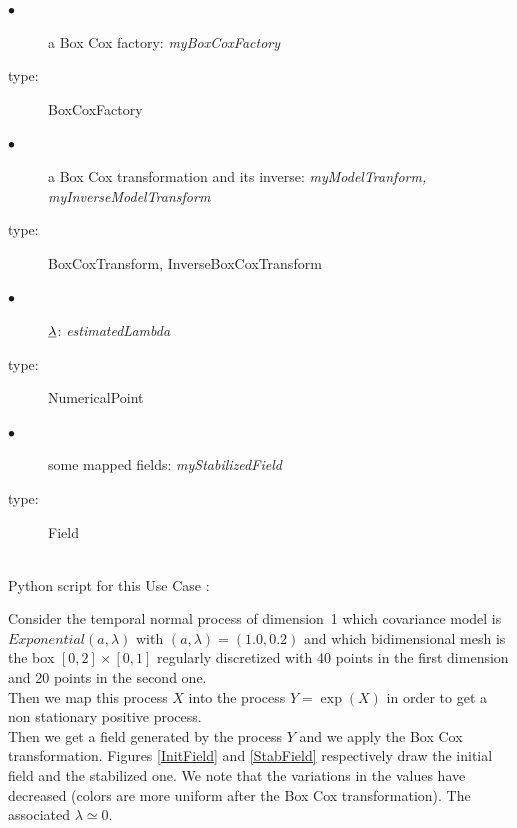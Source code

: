 {
  \begin{description}
  \item[$\bullet$] a Box Cox factory: {\itshape myBoxCoxFactory }
  \item[type:]  BoxCoxFactory
  \end{description}

  \begin{description}
  \item[$\bullet$] a Box Cox transformation and its inverse: {\itshape myModelTranform, myInverseModelTransform}
  \item[type:]  BoxCoxTransform, InverseBoxCoxTransform
  \end{description}


  \begin{description}
  \item[$\bullet$] ${\underline{\lambda}}$: {\itshape estimatedLambda}
  \item[type:]  NumericalPoint
  \end{description}


  \begin{description}
  \item[$\bullet$] some mapped fields: {\itshape myStabilizedField}
  \item[type:]  Field
  \end{description}
}

\textspace\\
Python script for this Use Case :



Consider the temporal normal process of dimension~1 which covariance model is $Exponential(a,\lambda)$ with $(a, \lambda)=(1.0, 0.2)$ and which  bidimensional mesh is the box $[0,2]\times [0,1]$ regularly discretized with 40 points in the first dimension and 20 points in the second one. \\
Then we map this process $X$ into the process $Y=\exp(X)$ in order to get a non stationary  positive process.\\
Then we get a field generated by the process $Y$ and we apply the Box Cox transformation. Figures \ref{InitField} and  \ref{StabField} respectively draw the initial field and the stabilized one. We note that the variations in the values have decreased (colors are more uniform after the Box Cox transformation). The associated $\lambda\simeq 0$.

